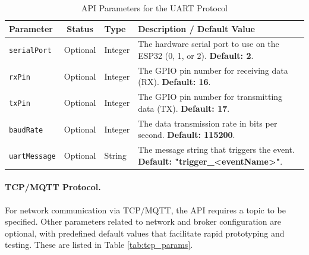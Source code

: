 \begin{table}[h!]
    \centering
    \caption{API Parameters for the UART Protocol}
    \label{tab:uart_params}
    \begin{tabular}{|l|c|l|p{6cm}|}
        \hline
        \textbf{Parameter} & \textbf{Status} & \textbf{Type} & \textbf{Description / Default Value} \\ \hline
        \texttt{serialPort} & Optional & Integer & The hardware serial port to use on the ESP32 (0, 1, or 2). \textbf{Default: 2}. \\ \hline
        \texttt{rxPin} & Optional & Integer & The GPIO pin number for receiving data (RX). \textbf{Default: 16}. \\ \hline
        \texttt{txPin} & Optional & Integer & The GPIO pin number for transmitting data (TX). \textbf{Default: 17}. \\ \hline
        \texttt{baudRate} & Optional & Integer & The data transmission rate in bits per second. \textbf{Default: 115200}. \\ \hline
        \texttt{uartMessage} & Optional & String & The message string that triggers the event. \textbf{Default: "trigger\_<eventName>"}. \\ \hline
    \end{tabular}
\end{table}

\paragraph{TCP/MQTT Protocol.} For network communication via TCP/MQTT, the API requires a topic to be specified. Other parameters related to network and broker configuration are optional, with predefined default values that facilitate rapid prototyping and testing. These are listed in Table \ref{tab:tcp_params}.


